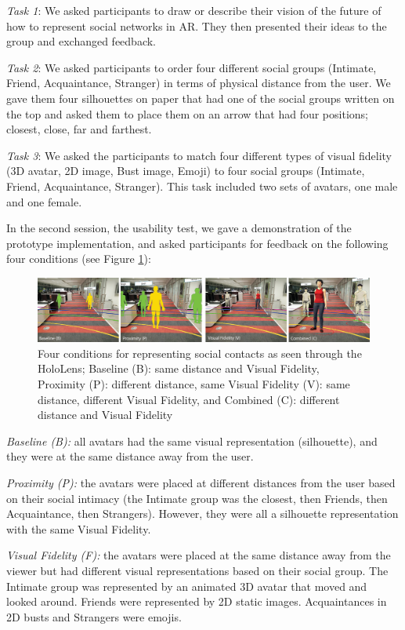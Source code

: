 \textit{Task 1}: We asked participants to draw or describe their vision of the future of how to represent social networks in AR. They then presented their ideas to the group and exchanged feedback.

\textit{Task 2}: We asked participants to order four different social groups (Intimate, Friend, Acquaintance, Stranger) in terms of physical distance from the user. We gave them four silhouettes on paper that had one of the social groups written on the top and asked them to place them on an arrow that had four positions; closest, close, far and farthest.

\textit{Task 3}: We asked the participants to match four different types of visual fidelity (3D avatar, 2D image, Bust image, Emoji) to four social groups (Intimate, Friend, Acquaintance, Stranger). This task included two sets of avatars, one male and one female.

In the second session, the usability test, we gave a demonstration of the prototype implementation, and asked participants for feedback on the following four conditions (see Figure \ref{fig:contacts:conditions}): 
\begin{figure}[h]
    \centering
    \includegraphics[width=\linewidth]{images/mgia17/conditions-transparent-background}
    \caption{Four conditions for representing social contacts as seen through the HoloLens; Baseline (B): same distance and Visual Fidelity, Proximity (P): different distance, same Visual Fidelity (V): same distance, different Visual Fidelity, and Combined (C): different distance and Visual Fidelity}
    \label{fig:contacts:conditions}
\end{figure}

\textit{Baseline (B):} all avatars had the same visual representation (silhouette), and they were at the same distance away from the user.

\textit{Proximity (P):} the avatars were placed at different distances from the user based on their social intimacy (the Intimate group was the closest, then Friends, then Acquaintance, then Strangers). However, they were all a silhouette representation with the same Visual Fidelity.

\textit{Visual Fidelity (F):} the avatars were placed at the same distance away from the viewer but had different visual representations based on their social group. The Intimate group was represented by an animated 3D avatar that moved and looked around. Friends were represented by 2D static images. Acquaintances in 2D busts and Strangers were emojis.

